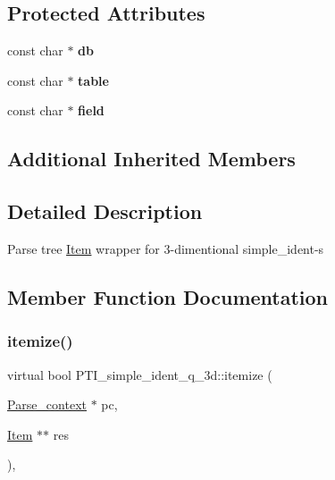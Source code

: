 \subsection*{Protected Attributes}
\begin{DoxyCompactItemize}
\item 
\mbox{\label{classPTI__simple__ident__q__3d_a854d23ce54a6c94fba485cc72c765c8f}} 
const char $\ast$ {\bfseries db}
\item 
\mbox{\label{classPTI__simple__ident__q__3d_a185f88db6a451b9aa5b8181718974bef}} 
const char $\ast$ {\bfseries table}
\item 
\mbox{\label{classPTI__simple__ident__q__3d_addd060d282dcee2c6914be77d60ab151}} 
const char $\ast$ {\bfseries field}
\end{DoxyCompactItemize}
\subsection*{Additional Inherited Members}


\subsection{Detailed Description}
Parse tree \mbox{\hyperlink{classItem}{Item}} wrapper for 3-\/dimentional simple\+\_\+ident-\/s 

\subsection{Member Function Documentation}
\mbox{\label{classPTI__simple__ident__q__3d_ad94d0e373c6cb86832c3206b706eaf0b}} 
\subsubsection{\texorpdfstring{itemize()}{itemize()}}
{\footnotesize\ttfamily virtual bool P\+T\+I\+\_\+simple\+\_\+ident\+\_\+q\+\_\+3d\+::itemize (\begin{DoxyParamCaption}\item[{\mbox{\hyperlink{structParse__context}{Parse\+\_\+context}} $\ast$}]{pc,  }\item[{\mbox{\hyperlink{classItem}{Item}} $\ast$$\ast$}]{res }\end{DoxyParamCaption})\hspace{0.3cm}{\ttfamily [inline]}, {\ttfamily [virtual]}}


